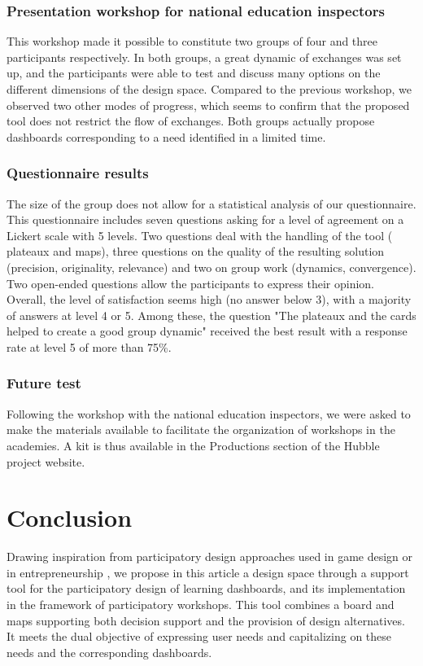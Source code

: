 \documentclass[manuscript,nonacm,12pt]{acmart}
\begin{document}
\subsubsection{Presentation workshop for national education inspectors}
This workshop made it possible to constitute two groups of four and three participants respectively. In both groups, a great dynamic of exchanges was set up, and the participants were able to test and discuss many options on the different dimensions of the design space. Compared to the previous workshop, we observed two other modes of progress, which seems to confirm that the proposed tool does not restrict the flow of exchanges. Both groups actually propose dashboards corresponding to a need identified in a limited time. 

\subsubsection{Questionnaire results}
The size of the group does not allow for a statistical analysis of our questionnaire. This questionnaire includes seven questions asking for a level of agreement on a Lickert scale with 5 levels. Two questions deal with the handling of the tool ( plateaux and maps), three questions on the quality of the resulting solution (precision, originality, relevance) and two on group work (dynamics, convergence). Two open-ended questions allow the participants to express their opinion. Overall, the level of satisfaction seems high (no answer below 3), with a majority of answers at level 4 or 5. Among these, the question "The plateaux and the cards helped to create a good group dynamic" received the best result with a response rate at level 5 of more than 75\%.

\subsubsection{Future test}
Following the workshop with the national education inspectors, we were asked to make the materials available to facilitate the organization of workshops in the academies. A kit is thus available in the Productions section of the Hubble project website.




\section{Conclusion}
Drawing inspiration from participatory design approaches used in game design \cite{hallifax2018design} or in entrepreneurship \cite{osterwalder2010business}, we propose in this article a design space through a support tool for the participatory design of learning dashboards, and its implementation in the framework of participatory workshops. This tool combines a board and maps supporting both decision support and the provision of design alternatives. It meets the dual objective of expressing user needs and capitalizing on these needs and the corresponding dashboards. 
\end{document}
